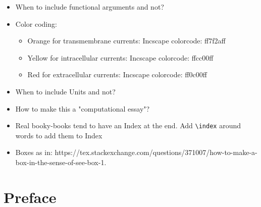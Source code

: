 \documentclass[prodtf]{EngC}
\numberwithin{equation}{chapter}
\numberwithin{figure}{chapter}
\numberwithin{table}{chapter}
\begin{document}
\begin{itemize}
\begin{itemize}
	Unfortunately, Harvard uses the convention that all authors are listed in the first citation and in
	subsequent citations just the first author's name followed by 'et al.' I think that listing all authors
	can get quite messy. This can be overridden by using a duble asterix after \begin{verbatim}	\cite**{} \end{verbatim}.
	\item Basic citation commands are "cite" for (Pettersen et al. 2018) and "citeasnoun" for
	Pettersen et al. (2008).
	\item Urls: I don't know why, but for some reason the harvard-bibtexing did not handle the urls
	in our ".bib"-file, so I removed them all. Now it works fine. I suggest that new bibtex-entries are
	copypasted in from google-scholar. My mendelay-generated entries contained some fields that 	the Harvard-style tried to to things with that it wasnt't able to.
	\end{itemize}
\item When to include functional arguments and not?
\item Color coding:
	\begin{itemize}
	\item Orange for transmembrane currents: Incscape colorcode: ff7f2aff
	\item Yellow for intracellular currents: Incscape colorcode: ffcc00ff
	\item Red for extracellular currents: Incscape colorcode: ff0c00ff
	\end{itemize}
\item When to include Units and not?
\item How to make this a "computational essay"?
\item Real booky-books tend to have an Index at the end. Add \verb|\index| around words to add them to Index
\item Boxes as in: https://tex.stackexchange.com/questions/371007/how-to-make-a-box-in-the-sense-of-see-box-1. 
\end{itemize}
\begin{flushright}\baselineskip
\end{flushright}


\chapter*{Preface}
\end{document}
